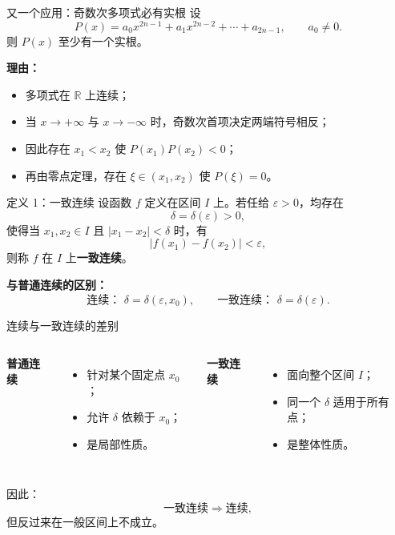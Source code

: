 ﻿\documentclass[aspectratio=169,11pt]{ctexbeamer}
\newcommand{\R}{\mathbb{R}}
\begin{document}
\begin{frame}{又一个应用：奇数次多项式必有实根}
设
\[
  P(x)=a_0x^{2n-1}+a_1x^{2n-2}+\cdots+a_{2n-1},\qquad a_0\ne 0.
\]
则 $P(x)$ 至少有一个实根。
\vspace{0.5em}

\textbf{理由：}
\begin{itemize}
  \item 多项式在 $\R$ 上连续；
  \item 当 $x\to+\infty$ 与 $x\to-\infty$ 时，奇数次首项决定两端符号相反；
  \item 因此存在 $x_1<x_2$ 使 $P(x_1)P(x_2)<0$；
  \item 再由零点定理，存在 $\xi\in(x_1,x_2)$ 使 $P(\xi)=0$。
\end{itemize}
\end{frame}

\begin{frame}{定义 1：一致连续}
设函数 $f$ 定义在区间 $I$ 上。若任给 $\varepsilon>0$，均存在
\[
  \delta=\delta(\varepsilon)>0,
\]
使得当 $x_1,x_2\in I$ 且 $|x_1-x_2|<\delta$ 时，有
\[
  |f(x_1)-f(x_2)|<\varepsilon,
\]
则称 $f$ 在 $I$ 上\textbf{一致连续}。
\vspace{0.5em}

\textbf{与普通连续的区别：}
\[
  \text{连续： }\delta=\delta(\varepsilon,x_0),\qquad
  \text{一致连续： }\delta=\delta(\varepsilon).
\]
\end{frame}

\begin{frame}{连续与一致连续的差别}
\begin{columns}[T]
\textbf{普通连续}
\begin{itemize}
  \item 针对某个固定点 $x_0$；
  \item 允许 $\delta$ 依赖于 $x_0$；
  \item 是局部性质。
\end{itemize}

\textbf{一致连续}
\begin{itemize}
  \item 面向整个区间 $I$；
  \item 同一个 $\delta$ 适用于所有点；
  \item 是整体性质。
\end{itemize}
\end{columns}
\vspace{0.7em}
因此：
\[
  \text{一致连续}\Longrightarrow \text{连续},
\]
但反过来在一般区间上不成立。
\end{frame}
\end{document}
